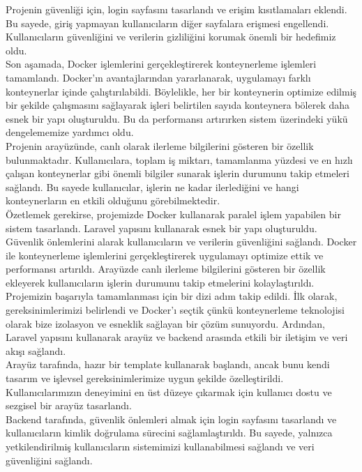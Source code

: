 Projenin güvenliği için, login sayfasını tasarlandı ve erişim kısıtlamaları eklendi. Bu sayede, giriş yapmayan kullanıcıların diğer sayfalara erişmesi engellendi. Kullanıcıların güvenliğini ve verilerin gizliliğini korumak önemli bir hedefimiz oldu.\\
Son aşamada, Docker işlemlerini gerçekleştirerek konteynerleme işlemleri tamamlandı. Docker'ın avantajlarından yararlanarak, uygulamayı farklı konteynerlar içinde çalıştırılabildi. Böylelikle, her bir konteynerin optimize edilmiş bir şekilde çalışmasını sağlayarak işleri belirtilen sayıda konteynera bölerek daha esnek bir yapı oluşturuldu. Bu da performansı artırırken sistem üzerindeki yükü dengelememize yardımcı oldu.\\
Projenin arayüzünde, canlı olarak ilerleme bilgilerini gösteren bir özellik bulunmaktadır. Kullanıcılara, toplam iş miktarı, tamamlanma yüzdesi ve en hızlı çalışan konteynerlar gibi önemli bilgiler sunarak işlerin durumunu takip etmeleri sağlandı. Bu sayede kullanıcılar, işlerin ne kadar ilerlediğini ve hangi konteynerların en etkili olduğunu görebilmektedir.\\
Özetlemek gerekirse, projemizde Docker kullanarak paralel işlem yapabilen bir sistem tasarlandı. Laravel  yapısını kullanarak esnek bir yapı oluşturuldu. Güvenlik önlemlerini alarak kullanıcıların ve verilerin güvenliğini sağlandı. Docker ile konteynerleme işlemlerini gerçekleştirerek uygulamayı optimize ettik ve performansı artırıldı. Arayüzde canlı ilerleme bilgilerini gösteren bir özellik ekleyerek kullanıcıların işlerin durumunu takip etmelerini kolaylaştırıldı.\\
Projemizin başarıyla tamamlanması için bir dizi adım takip edildi. İlk olarak, gereksinimlerimizi belirlendi ve Docker'ı seçtik çünkü konteynerleme teknolojisi olarak bize izolasyon ve esneklik sağlayan bir çözüm sunuyordu. Ardından, Laravel  yapısını kullanarak arayüz ve backend arasında etkili bir iletişim ve veri akışı sağlandı.\\
Arayüz tarafında, hazır bir template kullanarak başlandı, ancak bunu kendi tasarım ve işlevsel gereksinimlerimize uygun şekilde özelleştirildi. Kullanıcılarımızın deneyimini en üst düzeye çıkarmak için kullanıcı dostu ve sezgisel bir arayüz tasarlandı.\\
Backend tarafında, güvenlik önlemleri almak için login sayfasını tasarlandı ve kullanıcıların kimlik doğrulama sürecini sağlamlaştırıldı. Bu sayede, yalnızca yetkilendirilmiş kullanıcıların sistemimizi kullanabilmesi sağlandı ve veri güvenliğini sağlandı.\\
